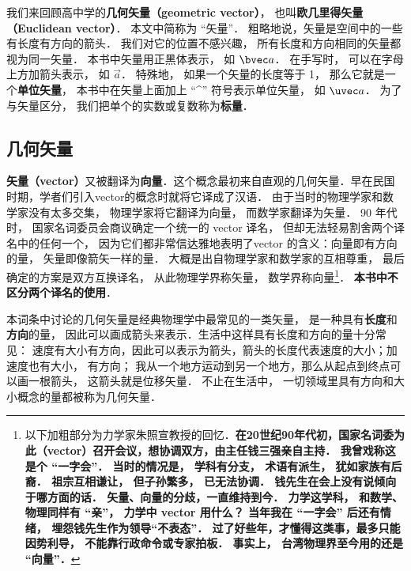 


我们来回顾高中学的\textbf{几何矢量（geometric vector）}， 也叫\textbf{欧几里得矢量（Euclidean vector）}． 本文中简称为 “矢量”． 粗略地说，矢量是空间中的一些有长度有方向的箭头． 我们对它的位置不感兴趣， 所有长度和方向相同的矢量都视为同一矢量． 本书中矢量用正黑体表示， 如 $\bvec a$． 在手写时， 可以在字母上方加箭头表示， 如 $\overrightarrow{a}$． 特殊地， 如果一个矢量的长度等于 1， 那么它就是一个\textbf{单位矢量}， 本书中在矢量上面加上 “\^{}” 符号表示单位矢量， 如 $\uvec a$． 为了与矢量区分， 我们把单个的实数或复数称为\textbf{标量}．

\subsection{几何矢量}

\textbf{矢量（vector）}又被翻译为\textbf{向量}．这个概念最初来自直观的几何矢量．早在民国时期，学者们引入vector的概念时就将它译成了汉语． 由于当时的物理学家和数学家没有太多交集， 物理学家将它翻译为向量， 而数学家翻译为矢量． 90 年代时， 国家名词委员会商议确定一个统一的 vector 译名， 但却无法轻易割舍两个译名中的任何一个， 因为它们都非常信达雅地表明了vector 的含义：向量即有方向的量， 矢量即像箭矢一样的量． 大概是出自物理学家和数学家的互相尊重， 最后确定的方案是双方互换译名， 从此物理学界称矢量， 数学界称向量\footnote{以下加粗部分为力学家朱照宣教授的回忆．\textbf{在20世纪90年代初，国家名词委为此（vector）召开会议，想协调双方，由主任钱三强亲自主持． 我曾戏称这是个 “一字会”． 当时的情况是， 学科有分支， 术语有派生， 犹如家族有后裔． 祖宗互相谦让， 但子孙繁多， 已无法协调． 钱先生在会上没有说倾向于哪方面的话． 矢量、向量的分歧，一直维持到今． 力学这学科， 和数学、物理同样有 “亲”， 力学中 vector 用什么？ 当年我在 “一字会” 后还有情绪， 埋怨钱先生作为领导“不表态”． 过了好些年，才懂得这类事，最多只能因势利导， 不能靠行政命令或专家拍板． 事实上， 台湾物理界至今用的还是 “向量”．}}． \textbf{本书中不区分两个译名的使用}．

本词条中讨论的几何矢量是经典物理学中最常见的一类矢量， 是一种具有\textbf{长度}和\textbf{方向}的量， 因此可以画成箭头来表示．生活中这样具有长度和方向的量十分常见： 速度有大小有方向，因此可以表示为箭头，箭头的长度代表速度的大小；加速度也有大小， 有方向； 我从一个地方运动到另一个地方，那么从起点到终点可以画一根箭头， 这箭头就是位移矢量． 不止在生活中， 一切领域里具有方向和大小概念的量都被称为几何矢量． 


